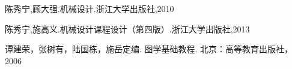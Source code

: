 \begin{thebibliography}{0}

陈秀宁,顾大强.机械设计.浙江大学出版社,2010

陈秀宁,施高义.机械设计课程设计（第四版）.浙江大学出版社,2013

谭建荣，张树有，陆国栋，施岳定编. 图学基础教程. 北京：高等教育出版社，2006
\end{thebibliography}